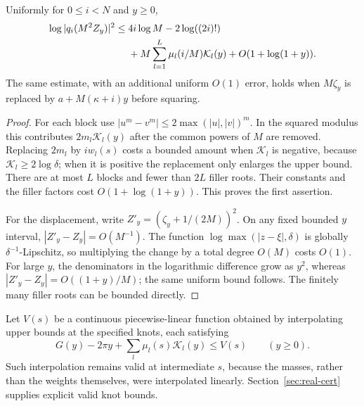 \begin{lemma}\label{lem:basis-potential}
Uniformly for $0\le i<N$ and $y\ge0$,
\begin{align}
 \log|q_i(M^2Z_y)|^2
 \le{}&4i\log M-2\log((2i)!)\notag\\
 &+M\sum_{l=1}^L\mu_l(i/M)\mathcal K_l(y)+O(1+\log(1+y)).
 \label{eq:basis-potential}
\end{align}
The same estimate, with an additional uniform $O(1)$ error, holds
when $M\zeta_y$ is replaced by $a+M(\kappa+i)y$ before squaring.
\end{lemma}
\begin{proof}
For each block use $|u^m-v^m|\le2\max(|u|,|v|)^m$.
In the squared modulus this contributes $2m_l\mathcal K_l(y)$
after the common powers of $M$ are removed.  Replacing $2m_l$ by
$iw_l(s)$ costs a bounded amount when $\mathcal K_l$ is negative,
because $\mathcal K_l\ge2\log\delta$; when it is positive the
replacement only enlarges the upper bound.  There are at most $L$
blocks and fewer than $2L$ filler roots.  Their constants and the
filler factors cost $O(1+\log(1+y))$.  This proves the first assertion.

For the displacement, write
$Z'_y=(\zeta_y+1/(2M))^2$.  On any fixed bounded $y$ interval,
$|Z'_y-Z_y|=O(M^{-1})$.  The function
$\log\max(|z-\xi|,\delta)$ is globally $\delta^{-1}$-Lipschitz,
so multiplying the change by a total degree $O(M)$ costs $O(1)$.
For large $y$, the denominators in the logarithmic difference grow
as $y^2$, whereas $|Z'_y-Z_y|=O((1+y)/M)$; the same uniform bound
follows.  The finitely many filler roots can be bounded directly.
\end{proof}

Let $V(s)$ be a continuous piecewise-linear function obtained by
interpolating upper bounds at the specified knots, each satisfying
\begin{equation}\label{eq:V}
 G(y)-2\pi y+\sum_l\mu_l(s)\mathcal K_l(y)\le V(s)
 \qquad(y\ge0).
\end{equation}
Such interpolation remains valid at intermediate $s$, because the
masses, rather than the weights themselves, were interpolated linearly.
Section~\ref{sec:real-cert} supplies explicit valid knot bounds.

